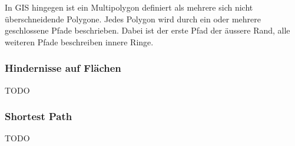 In GIS hingegen ist ein Multipolygon definiert als mehrere sich nicht überschneidende Polygone. Jedes Polygon wird durch ein oder mehrere geschlossene Pfade beschrieben. Dabei ist der erste Pfad der äussere Rand, alle weiteren Pfade beschreiben innere Ringe. \cite{opengis_simple_features}

\subsubsection{Hindernisse auf Flächen}
\label{Hindernisse in Flächen}

TODO %


\subsubsection{Shortest Path}
\label{Shortest Path}

TODO
